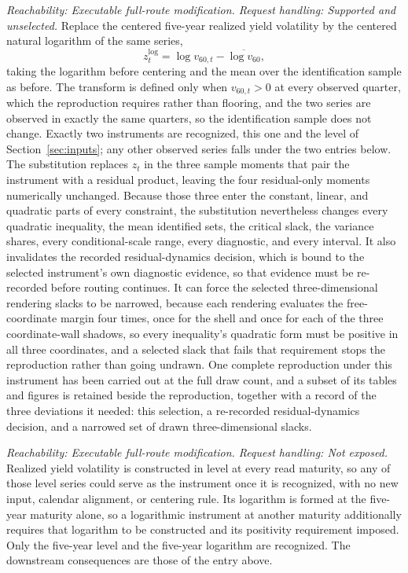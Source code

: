 \documentclass[11pt]{article}
\begin{document}
\begin{description}[style=nextline]
\item[Logarithmic instrument transform.]
\emph{Reachability: Executable full-route modification. Request handling: Supported and unselected.}
Replace the centered five-year realized yield volatility by the centered natural logarithm of the
same series,
\[
 z_t^{\log}=\log v_{60,t}-\overline{\log v_{60}},
\]
taking the logarithm before centering and the mean over the identification sample as before. The
transform is defined only when \(v_{60,t}>0\) at every observed quarter, which the reproduction
requires rather than flooring, and the two series are observed in exactly the same quarters, so the
identification sample does not change. Exactly two instruments are recognized, this one and the
level of Section~\ref{sec:inputs}; any other observed series falls under the two entries below. The
substitution replaces \(z_t\) in the three sample moments that pair the instrument with a residual
product, leaving the four residual-only moments numerically unchanged. Because those three enter the
constant, linear, and quadratic parts of every constraint, the substitution nevertheless changes
every quadratic inequality, the mean identified sets, the critical slack, the variance shares, every
conditional-scale range, every diagnostic, and every interval. It also invalidates the recorded
residual-dynamics decision, which is bound to the selected instrument's own diagnostic evidence, so
that evidence must be re-recorded before routing continues. It can force the selected
three-dimensional rendering slacks to be narrowed, because each rendering evaluates the
free-coordinate margin four times, once for the shell and once for each of the three coordinate-wall
shadows, so every inequality's quadratic form must be positive in all three coordinates, and a
selected slack that fails that requirement stops the reproduction rather than going undrawn. One complete reproduction under this
instrument has been carried out at the full draw count, and a subset of its tables and figures is
retained beside the reproduction, together with a record of the three deviations it needed: this
selection, a re-recorded residual-dynamics decision, and a narrowed set of drawn three-dimensional
slacks.

\item[Realized yield volatility at another maturity.]
\emph{Reachability: Executable full-route modification. Request handling: Not exposed.}
Realized yield volatility is constructed in level at every read maturity, so any of those level
series could serve as the instrument once it is recognized, with no new input, calendar alignment, or
centering rule. Its logarithm is formed at the five-year maturity alone, so a logarithmic instrument
at another maturity additionally requires that logarithm to be constructed and its positivity
requirement imposed. Only the five-year level and the five-year logarithm are recognized. The
downstream consequences are those of the entry above.


\end{description}
\end{document}
